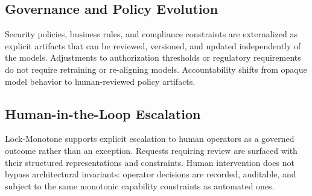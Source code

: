 \documentclass[conference]{IEEEtran}
\begin{document}
\subsection{Governance and Policy Evolution}
Security policies, business rules, and compliance constraints are
externalized as explicit artifacts that can be reviewed, versioned, and
updated independently of the models. Adjustments to authorization
thresholds or regulatory requirements do not require retraining or
re-aligning models. Accountability shifts from opaque model behavior to
human-reviewed policy artifacts.

\subsection{Human-in-the-Loop Escalation}
Lock-Monotone supports explicit escalation to human operators as a
governed outcome rather than an exception. Requests requiring review are
surfaced with their structured representations and constraints. Human
intervention does not bypass architectural invariants: operator decisions
are recorded, auditable, and subject to the same monotonic capability
constraints as automated ones.
\end{document}

